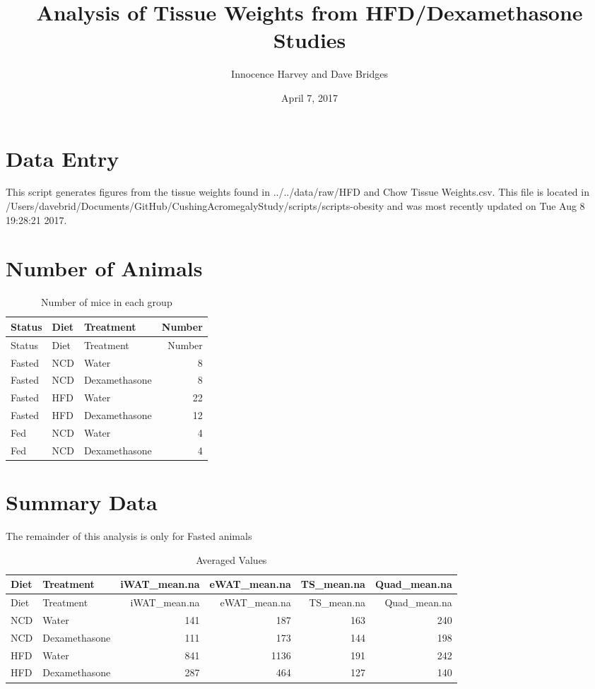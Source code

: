 \documentclass[]{article}
\title{Analysis of Tissue Weights from HFD/Dexamethasone Studies}
\author{Innocence Harvey and Dave Bridges}
\date{April 7, 2017}
\begin{document}
\maketitle

{
\setcounter{tocdepth}{2}
\tableofcontents
}
\section{Data Entry}\label{data-entry}

This script generates figures from the tissue weights found in
../../data/raw/HFD and Chow Tissue Weights.csv. This file is located in
/Users/davebrid/Documents/GitHub/CushingAcromegalyStudy/scripts/scripts-obesity
and was most recently updated on Tue Aug 8 19:28:21 2017.

\section{Number of Animals}\label{number-of-animals}

\begin{longtable}[]{@{}lllr@{}}
\caption{Number of mice in each group}\tabularnewline
\toprule
Status & Diet & Treatment & Number\tabularnewline
\midrule
\endfirsthead
\toprule
Status & Diet & Treatment & Number\tabularnewline
\midrule
\endhead
Fasted & NCD & Water & 8\tabularnewline
Fasted & NCD & Dexamethasone & 8\tabularnewline
Fasted & HFD & Water & 22\tabularnewline
Fasted & HFD & Dexamethasone & 12\tabularnewline
Fed & NCD & Water & 4\tabularnewline
Fed & NCD & Dexamethasone & 4\tabularnewline
\bottomrule
\end{longtable}

\section{Summary Data}\label{summary-data}

The remainder of this analysis is only for Fasted animals

\begin{longtable}[]{@{}llrrrr@{}}
\caption{Averaged Values}\tabularnewline
\toprule
Diet & Treatment & iWAT\_mean.na & eWAT\_mean.na & TS\_mean.na &
Quad\_mean.na\tabularnewline
\midrule
\endfirsthead
\toprule
Diet & Treatment & iWAT\_mean.na & eWAT\_mean.na & TS\_mean.na &
Quad\_mean.na\tabularnewline
\midrule
\endhead
NCD & Water & 141 & 187 & 163 & 240\tabularnewline
NCD & Dexamethasone & 111 & 173 & 144 & 198\tabularnewline
HFD & Water & 841 & 1136 & 191 & 242\tabularnewline
HFD & Dexamethasone & 287 & 464 & 127 & 140\tabularnewline
\bottomrule
\end{longtable}
\end{document}
